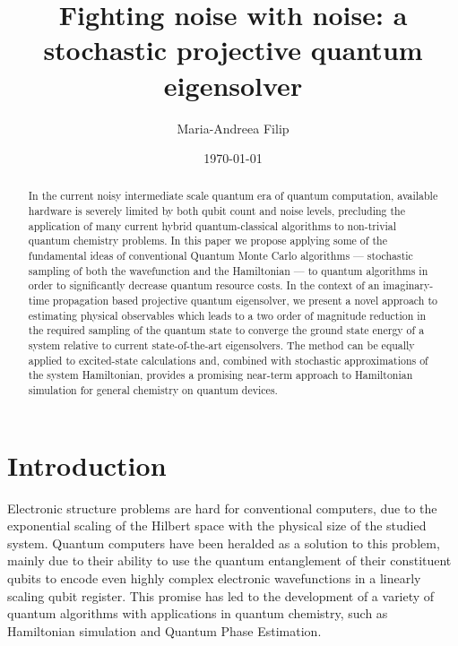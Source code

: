 \documentclass[%
 reprint,
 amsmath,amssymb,
 aps,
]{revtex4-2}
\begin{document}
\title{Fighting noise with noise: a stochastic projective quantum eigensolver}
\author{Maria-Andreea Filip}  

%  
\date{\today}%

\begin{abstract}

In the current noisy intermediate scale quantum  era of quantum computation, available hardware is severely limited by both qubit count and noise levels, precluding the application of many current hybrid quantum-classical algorithms to non-trivial quantum chemistry problems. In this paper we propose applying some of the fundamental ideas of conventional Quantum Monte Carlo algorithms --- stochastic sampling of both the wavefunction and the Hamiltonian --- to quantum algorithms in order to significantly decrease quantum resource costs. In the context of an imaginary-time propagation based projective quantum eigensolver, we present a novel approach to estimating physical observables which leads to a two order of magnitude reduction in the required sampling of the quantum state to converge the ground state energy of a system relative to current state-of-the-art eigensolvers. The method can be equally applied to excited-state calculations and, combined with stochastic approximations of the system Hamiltonian,  provides a promising near-term approach to  Hamiltonian simulation  for general chemistry on quantum devices.
\end{abstract}
\maketitle

\section{Introduction}
Electronic structure { problems are hard} for conventional computers, due to the exponential scaling of the Hilbert space with the physical size of the studied system. Quantum computers have been heralded as a solution to this problem,\cite{Feynman1982, Aspuru-Guzik2005} mainly due to their ability to use the quantum entanglement of their constituent qubits to encode even highly complex electronic wavefunctions in a linearly scaling qubit register. This promise has led to the development of a variety of quantum algorithms with applications in quantum chemistry, such as Hamiltonian simulation\cite{Berry2007, Berry2015, Low2017, Childs2018} and Quantum Phase Estimation.\cite{Abrams1997, Abrams1999}
\end{document}

